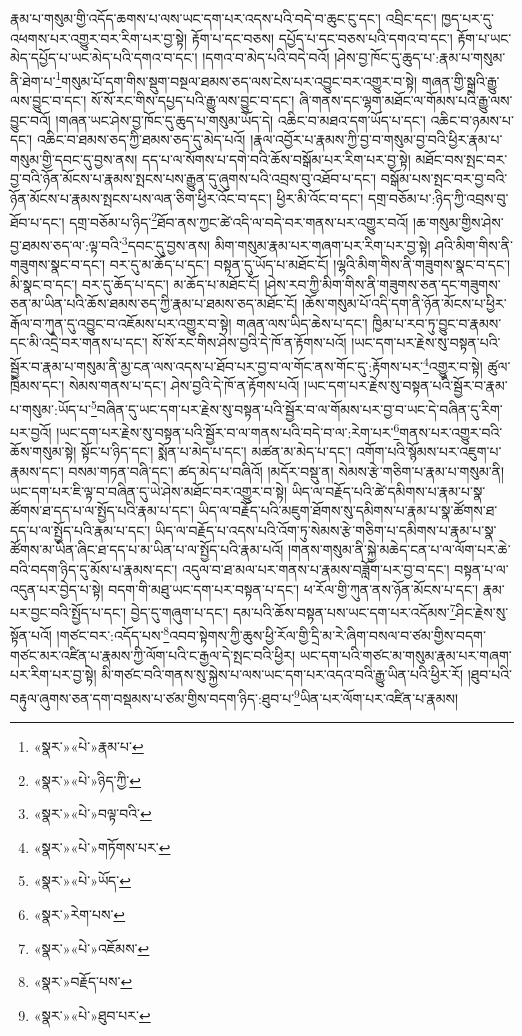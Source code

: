 རྣམ་པ་གསུམ་གྱི་འདོད་ཆགས་པ་ལས་ཡང་དག་པར་འདས་པའི་བདེ་བ་ཆུང་ངུ་དང་། འབྲིང་དང་། ཁྱད་པར་དུ་འཕགས་པར་འགྱུར་བར་རིག་པར་བྱ་སྟེ། རྟོག་པ་དང་བཅས། དཔྱོད་པ་དང་བཅས་པའི་དགའ་བ་དང་། རྟོག་པ་ཡང་མེད་དཔྱོད་པ་ཡང་མེད་པའི་དགའ་བ་དང་། །དགའ་བ་མེད་པའི་བདེ་བའོ། །ཤེས་བྱ་ཁོང་དུ་ཆུད་པ་:རྣམ་པ་གསུམ་ནི་ཐེག་པ་\footnote{«སྣར་»«པེ་»རྣམ་པ་}གསུམ་པོ་དག་གིས་སྡུག་བསྔལ་ཐམས་ཅད་ལས་ངེས་པར་འབྱུང་བར་འགྱུར་བ་སྟེ། གཞན་གྱི་སྒྲའི་རྒྱུ་ལས་བྱུང་བ་དང་། སོ་སོ་རང་གིས་དཔྱད་པའི་རྒྱུ་ལས་བྱུང་བ་དང་། ཞི་གནས་དང་ལྷག་མཐོང་ལ་གོམས་པའི་རྒྱུ་ལས་བྱུང་བའོ། །གཞན་ཡང་ཤེས་བྱ་ཁོང་དུ་ཆུད་པ་གསུམ་ཡོད་དེ། འཆིང་བ་མཐའ་དག་ཡོད་པ་དང་། འཆིང་བ་ཉམས་པ་དང་། འཆིང་བ་ཐམས་ཅད་ཀྱི་ཐམས་ཅད་དུ་མེད་པའོ། །རྣལ་འབྱོར་པ་རྣམས་ཀྱི་བྱ་བ་གསུམ་བྱ་བའི་ཕྱིར་རྣམ་པ་གསུམ་གྱི་དབང་དུ་བྱས་ནས། དད་པ་ལ་སོགས་པ་དགེ་བའི་ཆོས་བསྒོམ་པར་རིག་པར་བྱ་སྟེ། མཐོང་བས་སྤང་བར་བྱ་བའི་ཉོན་མོངས་པ་རྣམས་སྤངས་པས་རྒྱུན་དུ་ཞུགས་པའི་འབྲས་བུ་འཐོབ་པ་དང་། བསྒོམ་པས་སྤང་བར་བྱ་བའི་ཉོན་མོངས་པ་རྣམས་སྤངས་པས་ལན་ཅིག་ཕྱིར་འོང་བ་དང་། ཕྱིར་མི་འོང་བ་དང་། དགྲ་བཅོམ་པ་:ཉིད་ཀྱི་འབྲས་བུ་ཐོབ་པ་དང་། དགྲ་བཅོམ་པ་ཉིད་\footnote{«སྣར་»«པེ་»ཉིད་ཀྱི་}ཐོབ་ནས་ཀྱང་ཚེ་འདི་ལ་བདེ་བར་གནས་པར་འགྱུར་བའོ། །ཆ་གསུམ་གྱིས་ཤེས་བྱ་ཐམས་ཅད་ལ་:ལྟ་བའི་\footnote{«སྣར་»«པེ་»བལྟ་བའི་}དབང་དུ་བྱས་ནས། མིག་གསུམ་རྣམ་པར་གཞག་པར་རིག་པར་བྱ་སྟེ། ཤའི་མིག་གིས་ནི་གཟུགས་སྣང་བ་དང་། བར་དུ་མ་ཆོད་པ་དང་། བསྟན་དུ་ཡོད་པ་མཐོང་ངོ། །ལྷའི་མིག་གིས་ནི་གཟུགས་སྣང་བ་དང་། མི་སྣང་བ་དང་། བར་དུ་ཆོད་པ་དང་། མ་ཆོད་པ་མཐོང་ངོ། །ཤེས་རབ་ཀྱི་མིག་གིས་ནི་གཟུགས་ཅན་དང་གཟུགས་ཅན་མ་ཡིན་པའི་ཆོས་ཐམས་ཅད་ཀྱི་རྣམ་པ་ཐམས་ཅད་མཐོང་ངོ། །ཆོས་གསུམ་པོ་འདི་དག་ནི་ཉོན་མོངས་པ་ཕྱིར་རྒོལ་བ་ཀུན་དུ་འབྱུང་བ་འཇོམས་པར་འགྱུར་བ་སྟེ། གཞན་ལས་ཡིད་ཆེས་པ་དང་། ཁྱིམ་པ་རབ་ཏུ་བྱུང་བ་རྣམས་དང་མི་འདྲེ་བར་གནས་པ་དང་། སོ་སོ་རང་གིས་ཤེས་བྱའི་དེ་ཁོ་ན་རྟོགས་པའོ། །ཡང་དག་པར་རྗེས་སུ་བསྟན་པའི་སྦྱོར་བ་རྣམ་པ་གསུམ་ནི་མྱ་ངན་ལས་འདས་པ་ཐོབ་པར་བྱ་བ་ལ་གོང་ནས་གོང་དུ་:རྟོགས་པར་\footnote{«སྣར་»«པེ་»གཏོགས་པར་}འགྱུར་བ་སྟེ། ཚུལ་ཁྲིམས་དང་། སེམས་གནས་པ་དང་། ཤེས་བྱའི་དེ་ཁོ་ན་རྟོགས་པའོ། །ཡང་དག་པར་རྗེས་སུ་བསྟན་པའི་སྦྱོར་བ་རྣམ་པ་གསུམ་:ཡོད་པ་\footnote{«སྣར་»«པེ་»ཡོད་}བཞིན་དུ་ཡང་དག་པར་རྗེས་སུ་བསྟན་པའི་སྦྱོར་བ་ལ་གོམས་པར་བྱ་བ་ཡང་དེ་བཞིན་དུ་རིག་པར་བྱའོ། །ཡང་དག་པར་རྗེས་སུ་བསྟན་པའི་སྦྱོར་བ་ལ་གནས་པའི་བདེ་བ་ལ་:རེག་པར་\footnote{«སྣར་»རེག་པས་}གནས་པར་འགྱུར་བའི་ཆོས་གསུམ་སྟེ། སྟོང་པ་ཉིད་དང་། སྨོན་པ་མེད་པ་དང་། མཚན་མ་མེད་པ་དང་། འགོག་པའི་སྙོམས་པར་འཇུག་པ་རྣམས་དང་། བསམ་གཏན་བཞི་དང་། ཚད་མེད་པ་བཞིའོ། །མདོར་བསྡུ་ན། སེམས་རྩེ་གཅིག་པ་རྣམ་པ་གསུམ་ནི། ཡང་དག་པར་ཇི་ལྟ་བ་བཞིན་དུ་ཡེ་ཤེས་མཐོང་བར་འགྱུར་བ་སྟེ། ཡིད་ལ་བརྗོད་པའི་ཚེ་དམིགས་པ་རྣམ་པ་སྣ་ཚོགས་ཐ་དད་པ་ལ་སྤྱོད་པའི་རྣམ་པ་དང་། ཡིད་ལ་བརྗོད་པའི་མཇུག་ཐོགས་སུ་དམིགས་པ་རྣམ་པ་སྣ་ཚོགས་ཐ་དད་པ་ལ་སྤྱོད་པའི་རྣམ་པ་དང་། ཡིད་ལ་བརྗོད་པ་འདས་པའི་འོག་ཏུ་སེམས་རྩེ་གཅིག་པ་དམིགས་པ་རྣམ་པ་སྣ་ཚོགས་མ་ཡིན་ཞིང་ཐ་དད་པ་མ་ཡིན་པ་ལ་སྤྱོད་པའི་རྣམ་པའོ། །གནས་གསུམ་ནི་སྐྱེ་མཆེད་ངན་པ་ལ་ལོག་པར་ཆེ་བའི་བདག་ཉིད་དུ་མོས་པ་རྣམས་དང་། འདུལ་བ་ཐ་མལ་པར་གནས་པ་རྣམས་བཟློག་པར་བྱ་བ་དང་། བསྟན་པ་ལ་འདུན་པར་བྱེད་པ་སྟེ། བདག་གི་མཐུ་ཡང་དག་པར་བསྟན་པ་དང་། ཕ་རོལ་གྱི་ཀུན་ནས་ཉོན་མོངས་པ་དང་། རྣམ་པར་བྱང་བའི་སྤྱོད་པ་དང་། བྱེད་དུ་གཞུག་པ་དང་། དམ་པའི་ཆོས་བསྟན་པས་ཡང་དག་པར་འདོམས་\footnote{«སྣར་»«པེ་»འཇོམས་}ཤིང་རྗེས་སུ་སྟོན་པའོ། །གཙང་བར་:འདོད་པས་\footnote{«སྣར་»བརྗོད་པས་}འབབ་སྟེགས་ཀྱི་ཆུས་ཕྱི་རོལ་གྱི་དྲི་མ་རེ་ཞིག་བསལ་བ་ཙམ་གྱིས་བདག་གཙང་མར་འཛིན་པ་རྣམས་ཀྱི་ལོག་པའི་ང་རྒྱལ་དེ་སྤང་བའི་ཕྱིར། ཡང་དག་པའི་གཙང་མ་གསུམ་རྣམ་པར་གཞག་པར་རིག་པར་བྱ་སྟེ། མི་གཙང་བའི་གནས་སུ་སྐྱེས་པ་ལས་ཡང་དག་པར་འདའ་བའི་རྒྱུ་ཡིན་པའི་ཕྱིར་རོ། །ཐུབ་པའི་བརྟུལ་ཞུགས་ཅན་དག་བསྡམས་པ་ཙམ་གྱིས་བདག་ཉིད་:ཐུབ་པ་\footnote{«སྣར་»«པེ་»ཐུབ་པར་}ཡིན་པར་ལོག་པར་འཛིན་པ་རྣམས། 